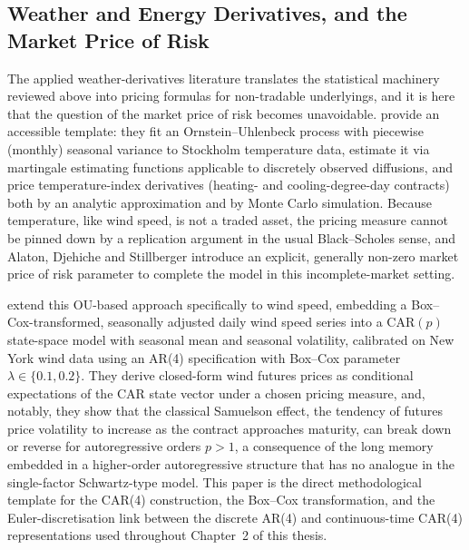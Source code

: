 ﻿\documentclass[11pt, a4paper, twoside]{article}
\begin{document}
\subsection{Weather and Energy Derivatives, and the Market Price of Risk}
\label{sec:lit-derivatives}

The applied weather-derivatives literature translates the statistical machinery reviewed above into pricing formulas for non-tradable underlyings, and it is here that the question of the market price of risk becomes unavoidable. \citet{AlatonEtAl2002} provide an accessible template: they fit an Ornstein--Uhlenbeck process with piecewise (monthly) seasonal variance to Stockholm temperature data, estimate it via martingale estimating functions applicable to discretely observed diffusions, and price temperature-index derivatives (heating- and cooling-degree-day contracts) both by an analytic approximation and by Monte Carlo simulation. Because temperature, like wind speed, is not a traded asset, the pricing measure cannot be pinned down by a replication argument in the usual Black--Scholes sense, and Alaton, Djehiche and Stillberger introduce an explicit, generally non-zero market price of risk parameter to complete the model in this incomplete-market setting.

\citet{BenthSaltyteBenth2009} extend this OU-based approach specifically to wind speed, embedding a Box--Cox-transformed, seasonally adjusted daily wind speed series into a CAR$(p)$ state-space model with seasonal mean and seasonal volatility, calibrated on New York wind data using an AR(4) specification with Box--Cox parameter $\lambda \in \{0.1, 0.2\}$. They derive closed-form wind futures prices as conditional expectations of the CAR state vector under a chosen pricing measure, and, notably, they show that the classical Samuelson effect, the tendency of futures price volatility to increase as the contract approaches maturity, can break down or reverse for autoregressive orders $p > 1$, a consequence of the long memory embedded in a higher-order autoregressive structure that has no analogue in the single-factor Schwartz-type model. This paper is the direct methodological template for the CAR(4) construction, the Box--Cox transformation, and the Euler-discretisation link between the discrete AR(4) and continuous-time CAR(4) representations used throughout Chapter~2 of this thesis.
\end{document}
